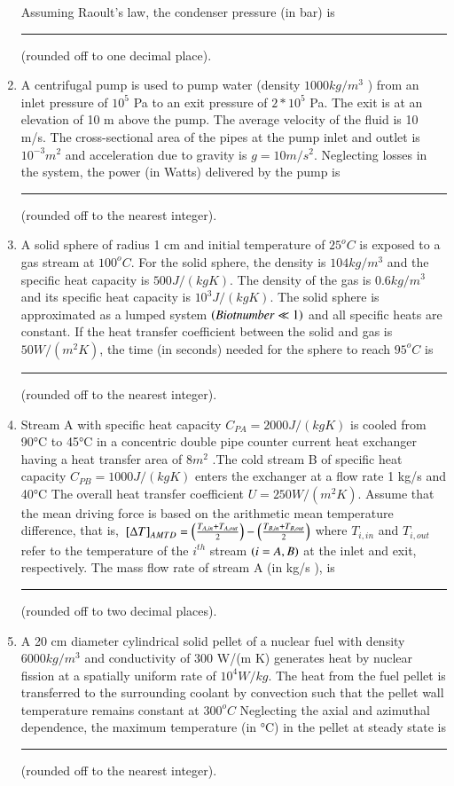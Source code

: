 \documentclass[journal,12pt,onecolumn]{IEEEtran}
\theoremstyle{remark}
\begin{document}
\begin{enumerate}
    

    Assuming Raoult's law, the condenser pressure (in bar) is \rule{3cm}{0.1mm} (rounded off to one decimal place).
    
\hfill{}
    \item A centrifugal pump is used to pump water (density $1000 kg/m^3$ ) from an inlet pressure of $10^5$ Pa to an exit pressure of $2*10^5$ Pa. The exit is at an elevation of 10 m above the pump. The average velocity of the fluid is 10 m/s. The cross-sectional area of the pipes at the pump inlet and outlet is $10^{-3} m^2$ and acceleration due to gravity is $g = 10 m/s^2 $. Neglecting losses in the system, the power (in Watts) delivered by the pump is \rule{1.5cm}{0.1mm}(rounded off to the nearest integer). 
    
\hfill{}
    \item A solid sphere of radius 1 cm and initial temperature of $25^oC$ is exposed to a gas stream at $100^oC$. For the solid sphere, the density is $104 kg/m^3$ and the specific heat capacity is $500 J/(kg K)$. The density of the gas is $0.6 kg/m^3$ and its specific heat capacity is $10^3 J/(kg K)$. The solid sphere is approximated as a lumped system $\left(Biot number \ll 1\right)$ and all specific heats are constant. If the heat transfer coefficient between the solid and gas is $50 W/(m^2 K)$, the time (in seconds) needed for the sphere to reach $95^oC$ is \rule{2cm}{0.1mm} (rounded off to the nearest integer).
    
\hfill{}
    \item Stream A with specific heat capacity $C_{PA}= 2000 J/(kg K)$ is cooled from 90°C to 45°C in a concentric double pipe counter current heat exchanger having a heat transfer area of $8m^2$ .The cold stream B of specific heat capacity $C_{PB} = 1000 J/(kg K)$ enters the exchanger at a flow rate 1 kg/s and 40°C The overall heat transfer coefficient $U = 250 W/(m^2 K)$. Assume that the mean driving force is based on the arithmetic mean temperature difference, that is, ${}\left[\Delta T\right]_{AMTD} = \left(\frac{T_{A,in} + T_{A,out}}{2}\right) - \left(\frac{T_{B,in} + T_{B,out}}{2}\right)$ where $T_{i,in}$ and $T_{i,out}$ refer to the temperature of the $i^{th}$ stream $\left(i = A, B\right)$ at the inlet and exit, respectively. The mass flow rate of stream A (in kg/s ), is \rule{2cm}{0.1mm}(rounded off to two decimal places).
    
\hfill{}
\newpage
    \item A 20 cm diameter cylindrical solid pellet of a nuclear fuel with density $6000 kg/m^3$ and conductivity of 300 W/(m K) generates heat by nuclear fission at a spatially uniform rate of $10^4 W /kg$. The heat from the fuel pellet is transferred to the surrounding coolant by convection such that the pellet wall temperature remains constant at $300^oC$ Neglecting the axial and azimuthal dependence, the maximum temperature (in °C) in the pellet at steady state is \rule{2cm}{0.1mm} (rounded off to the nearest integer). 
    

\end{enumerate}
\end{document}
